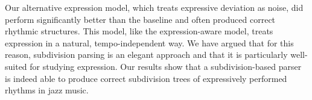 Our alternative expression model, which treats expressive deviation as noise, did perform significantly better than the baseline and often produced correct rhythmic structures. This model, like the expression-aware model, treats expression in a natural, tempo-independent way. We have argued that for this reason, subdivision parsing is an elegant approach and that it is particularly well-suited for studying expression. Our results show that a subdivision-based parser is indeed able to produce correct subdivision trees of expressively performed rhythms in jazz music.